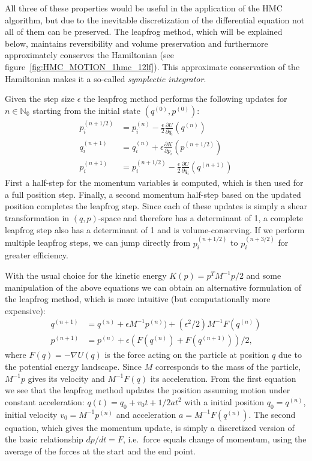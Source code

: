 All three of these properties would be useful in the application of the HMC algorithm, but due to the inevitable discretization of the differential equation not all of them can be preserved. The leapfrog method, which will be explained below, maintains reversibility and volume preservation and furthermore approximately conserves the Hamiltonian (see figure~\ref{fig:HMC_MOTION_1hmc_12lf}). This approximate conservation of the Hamiltonian makes it a so-called \textit{symplectic integrator}.

Given the step size $\epsilon$ the leapfrog method performs the following updates for $n \in \mathbb{N_0}$ starting from the initial state $(q^{(0)}, p^{(0)})$:
\begin{equation}
\begin{split}
p_i^{(n + 1/2)} &= p_i^{(n)} - \frac{\epsilon}{2} \frac{\partial U}{\partial q_i}(q^{(n)}) \\
q_i^{(n + 1)} &= q_i^{(n)} + \epsilon \frac{\partial K}{\partial p_i}(p^{(n + 1/2)}) \\
p_i^{(n + 1)} &= p_i^{(n + 1/2)} - \frac{\epsilon}{2} \frac{\partial U}{\partial q_i}(q^{(n + 1)})
\end{split}
\end{equation}
First a half-step for the momentum variables is computed, which is then used for a full position step. Finally, a second momentum half-step based on the updated position completes the leapfrog step. Since each of these updates is simply a shear transformation in $(q, p)$-space and therefore has a determinant of 1, a complete leapfrog step also has a determinant of 1 and is volume-conserving. If we perform multiple leapfrog steps, we can jump directly from $p_i^{(n + 1/2)}$ to $p_i^{(n + 3/2)}$ for greater efficiency.

With the usual choice for the kinetic energy $K(p) = p^T M^{-1} p /2$ and some manipulation of the above equations we can obtain an alternative formulation of the leapfrog method, which is more intuitive (but computationally more expensive):
\begin{equation}
\begin{split}
q^{(n + 1)} &= q^{(n)} + \epsilon M^{-1} p^{(n)}) + (\epsilon^2/2) M^{-1} F(q^{(n)}) \\
p^{(n + 1)} &= p^{(n)} + \epsilon (F(q^{(n)}) + F(q^{(n+1)}))/2,
\end{split}
\end{equation}
where $F(q) = - \nabla U(q)$ is the force acting on the particle at position $q$ due to the potential energy landscape. Since $M$ corresponds to the mass of the particle, $M^{-1} p$ gives its velocity and $M^{-1} F(q)$ its acceleration. From the first equation we see that the leapfrog method updates the position assuming motion under constant acceleration: $q(t) = q_0 + v_0 t + 1/2 a t^2$ with a initial position $q_0 = q^{(n)}$, initial velocity $v_0 = M^{-1} p^{(n)}$ and acceleration $a = M^{-1} F(q^{(n)})$. The second equation, which gives the momentum update, is simply a discretized version of the basic relationship $dp/dt = F$, i.e.\ force equals change of momentum, using the average of the forces at the start and the end point.

